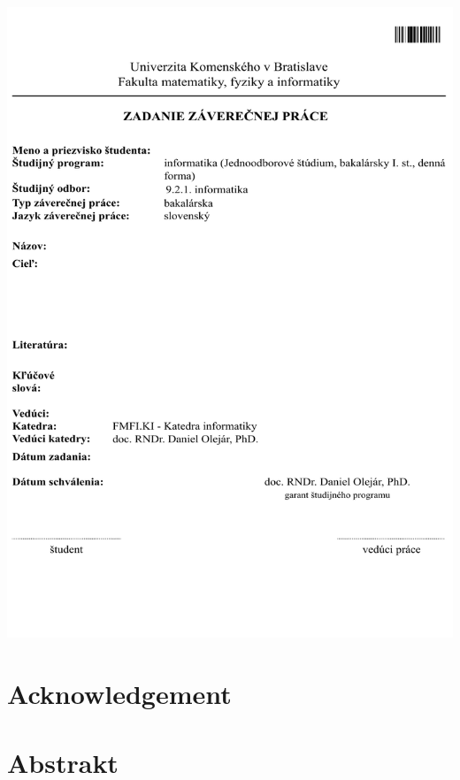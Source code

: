 \documentclass[12pt, oneside]{book}
\begin{document}
\newpage 
\thispagestyle{empty}
\hspace{-2cm}\includegraphics[width=1.1\textwidth]{images/zadanie}


\frontmatter

\setcounter{page}{3}
\newpage 
\chapter*{Acknowledgement}


\newpage 
\chapter*{Abstrakt}
\end{document}
